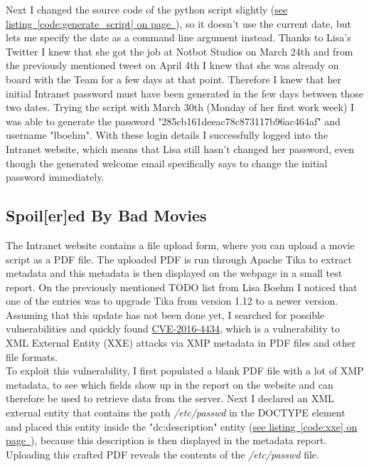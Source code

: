 Next I changed the source code of the python script slightly (\hyperref[code:generate_script]{see listing~\ref*{code:generate_script} on page~\pageref*{code:generate_script}}), so it doesn't use the current date, but lets me specify the date as a command line argument instead. Thanks to Lisa's Twitter I knew that she got the job at Notbot Studios on March 24th and from the previously mentioned tweet on April 4th I knew that she was already on board with the Team for a few days at that point. Therefore I knew that her initial Intranet password must have been generated in the few days between those two dates. Trying the script with March 30th (Monday of her first work week) I was able to generate the password "285cb161deeac78c873117b96ac464af" and username "lboehm". With these login details I successfully logged into the Intranet website, which means that Lisa still hasn't changed her password, even though the generated welcome email specifically says to change the initial password immediately.



\subsection{Spoil[er]ed By Bad Movies}

The Intranet website contains a file upload form, where you can upload a movie script as a PDF file. The uploaded PDF is run through Apache Tika to extract metadata and this metadata is then displayed on the webpage in a small test report. On the previously mentioned TODO list from Lisa Boehm I noticed that one of the entries was to upgrade Tika from version 1.12 to a newer version. Assuming that this update has not been done yet, I searched for possible vulnerabilities and quickly found \href{https://www.cvedetails.com/cve/CVE-2016-4434/}{CVE-2016-4434}, which is a vulnerability to XML External Entity (XXE) attacks via XMP metadata in PDF files and other file formats. \\

To exploit this vulnerability, I first populated a blank PDF file with a lot of XMP metadata, to see which fields show up in the report on the website and can therefore be used to retrieve data from the server. Next I declared an XML external entity that contains the path \textit{/etc/passwd} in the DOCTYPE element and placed this entity inside the "dc:description" entity (\hyperref[code:xxe]{see listing~\ref*{code:xxe} on page~\pageref*{code:xxe}}), because this description is then displayed in the metadata report. Uploading this crafted PDF reveals the contents of the \textit{/etc/passwd} file. \\

